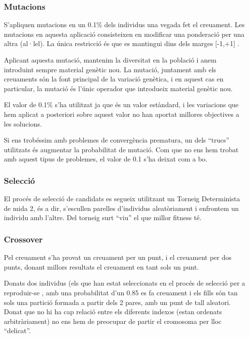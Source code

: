 \subsubsection{Mutacions} %
\label{ssub:Mutacions}

S'apliquen mutacions en un 0.1\% dels individus una vegada fet el creuament.
Les mutacions en aquesta aplicació consisteixen en modificar una ponderació per
una altra (al·lel).  La única restricció és que es mantingui dins dels marges
[-1,+1] .  

Aplicant aquesta mutació, mantenim la diversitat en la població i anem
introduint sempre material genètic nou.  La mutació, juntament amb els
creuaments són la font principal de la variació genètica, i en aquest cas en
particular, la mutació és l'únic operador que introdueix material genètic nou.

El valor de 0.1\% s'ha utilitzat ja que és un valor estàndard, i les variacions
que hem aplicat a posteriori sobre aquest valor no han aportat millores
objectives a les solucions.

Si ens trobéssim amb problemes de convergència prematura, un dels ``trucs''
utilitzats és augmentar la probabilitat de mutació.  Com que no ens hem trobat
amb aquest tipus de problemes, el valor de 0.1 s'ha deixat com a bo.

\subsubsection{Selecció} %
\label{ssub:Seleccio}
El procés de selecció de candidats es segueix utilitzant un Torneig
Determinista de mida 2, és a dir, s'escullen parelles d'individus
aleatòriament i enfrontem un individu amb l'altre. Del torneig surt ``viu'' el
que millor fitness té.

\subsubsection{Crossover} %
\label{ssub:Crossover}

Pel creuament s'ha provat un creuament per un punt, i el creuament per dos
punts, donant millors resultats el creuament en tant sols un punt.  

Donats dos individus (els que han estat seleccionats en el procés de
selecció per a reproduir-se , amb una probabilitat d'un 0.85 es fa creuament i
els fills són tan sols una partició formada a partir dels 2 pares, amb un punt
de tall aleatori.  Donat que no hi ha cap relació entre els diferents indexos
(estan ordenats arbitràriament) no ens hem de preocupar de partir el cromosoma
per lloc ``delicat''. 

